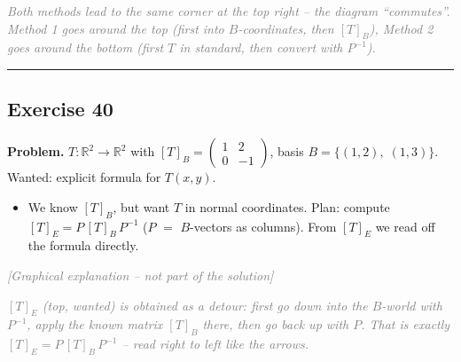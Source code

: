 \documentclass[a4paper,12pt]{article}
\newcommand{\grafik}{\textcolor{gray}{\small\textit{[Graphical explanation -- not part of the solution]}}}
\begin{document}
\textcolor{gray}{\small\textit{Both methods lead to the same corner at the top right -- the diagram ``commutes''. Method 1 goes around the top (first into $B$-coordinates, then $[T]_B$), Method 2 goes around the bottom (first $T$ in standard, then convert with $P^{-1}$).}}

\bigskip
\hrule
\bigskip

\subsection*{Exercise 40}

\textbf{Problem.} $T \colon \mathbb{R}^2 \to \mathbb{R}^2$ with $[T]_B = \begin{pmatrix} 1 & 2 \\ 0 & -1 \end{pmatrix}$, basis $B = \{(1,2),\; (1,3)\}$. Wanted: explicit formula for $T(x, y)$.

\begin{wastun}
\begin{itemize}[leftmargin=*, nosep]
    \item We know $[T]_B$, but want $T$ in normal coordinates. Plan: compute $[T]_E = P\,[T]_B\,P^{-1}$ ($P$ $=$ $B$-vectors as columns). From $[T]_E$ we read off the formula directly.
\end{itemize}
\end{wastun}

\grafik

\begin{center}
\end{center}

\textcolor{gray}{\small\textit{$[T]_E$ (top, wanted) is obtained as a detour: first go down into the $B$-world with $P^{-1}$, apply the known matrix $[T]_B$ there, then go back up with $P$. That is exactly $[T]_E = P\,[T]_B\,P^{-1}$ -- read right to left like the arrows.}}
\end{document}
